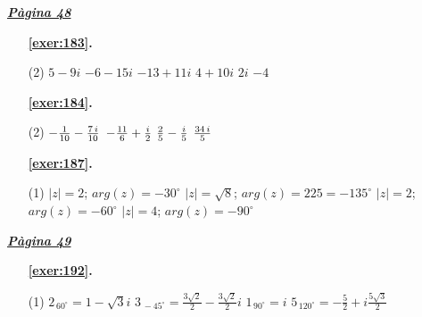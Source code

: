  \vspace{1cm} 
 

\vspace{0.3cm}


\hyperlink{page.48}{\textbf{\em Pàgina 48}}
\begin{enumerate}



 \item[\fontfamily{phv}\selectfont\color{blue}\textbf{\ref{exer:183}. }] \label{ans:183}
 \begin{tasks}[column-sep=1em, item-indent=1.3333em](2)
	 \task  $5 -9i$
	 \task $-6-15i$
	 \task $-13+11i$
	 \task $4 + 10i$
	 \task $2i$
	 \task $-4$
\end{tasks}
 \end{enumerate}
\begin{enumerate}



 \item[\fontfamily{phv}\selectfont\color{blue}\textbf{\ref{exer:184}. }] \label{ans:184}
 \begin{tasks}[column-sep=1em, item-indent=1.3333em](2)
	 \task  $-{{1}\over {10}}-{{7\,i}\over {10}}$
	 \task $-{{11}\over {6}}+{{i}\over {2}}$
	 \task ${{2}\over {5}}-{{i}\over {5}}$
	 \task ${{34\,i}\over {5}}$
\end{tasks}



 \item[\fontfamily{phv}\selectfont\color{blue}\textbf{\ref{exer:187}. }] \label{ans:187}
 \begin{tasks}[column-sep=1em, item-indent=1.3333em](1)
	 \task  $|z|=2$; $arg(z)=-30^\circ $
	 \task* $|z|=\sqrt {8}$; $arg(z)=225 = - 135^\circ $
	 \task $|z|=2$; $arg(z)=-60^\circ $
	 \task $|z|=4$; $arg(z)=-90^\circ $
\end{tasks}
 \end{enumerate}
\vspace{0.3cm}


\hyperlink{page.49}{\textbf{\em Pàgina 49}}
\begin{enumerate}



 \item[\fontfamily{phv}\selectfont\color{blue}\textbf{\ref{exer:192}. }] \label{ans:192}
 \begin{tasks}[column-sep=1em, item-indent=1.3333em](1)
	 \task*  $2_{\,60^\circ }= 1 - \sqrt {3} i$
	 \task* $3_{\,-45^\circ }= \frac {3\sqrt {2}}{2} - \frac {3\sqrt {2}}{2} i$
	 \task $1_{\,90^\circ }= i $
	 \task* $5_{\,120^\circ }= -\frac {5}{2} + i \frac {5\sqrt {3}}{2}$
\end{tasks}
 \end{enumerate}
\vspace{0.3cm}

